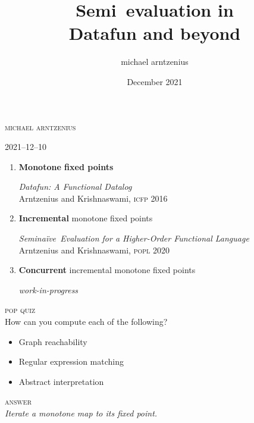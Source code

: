 \documentclass[aspectratio=141,dvipsnames]{beamer}
\title{Semi\naive\ evaluation in\\ Datafun and beyond}
\author{michael arntzenius}
\date{December 2021}
\newcommand\standout{\color{standout}}
\providecommand\displayfamily\rmfamily
\newcommand\naive{na\"ive}
\begin{document}
  \Large

  \begin{frame}
    \displayfamily
    \centering
    \vfill
    {\standout\Huge\itshape\inserttitle\par}\vspace{3ex}
    {\scshape michael arntzenius}\par\vspace{1ex}
    {2021–12–10}
    \vfill
  \end{frame}


  \begin{frame}
    \begin{enumerate}
    \setlength\itemsep{3ex}
    \item \textbf{Monotone fixed points}
      \\[1ex]
      
      {\small \emph{Datafun: A Functional Datalog}\\
        {Arntzenius and Krishnaswami}, \scshape icfp 2016 \par}
      
    \item \textbf{Incremental} monotone fixed points
      \\[1ex]

      {\small \emph{Semi\naive\ Evaluation for a Higher-Order Functional
          Language}\\
        {Arntzenius and Krishnaswami}, \scshape popl 2020 \par}
      
    \item \textbf{Concurrent} incremental monotone fixed points

      {\small \itshape work-in-progress}
    \end{enumerate}
  \end{frame}


  \begin{frame}
    \textsc{pop quiz}\\ How can you compute each of the following?
    \vspace{1ex}
    \begin{itemize}
    \item Graph reachability
    \item Regular expression matching
    \item Abstract interpretation
    \end{itemize}

    \vspace{1ex}

    \textsc{answer}\\ \itshape Iterate a monotone map to its fixed point.

    \vspace{\baselineskip}

  \end{frame}
\end{document}

